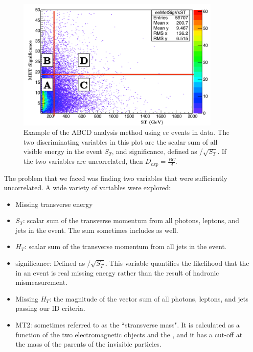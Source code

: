 \begin{figure}[h]
\begin{center}
\includegraphics[width=0.9\textwidth]{Figures/Appendix/ABCD_demo.pdf}
\end{center}
\caption[Example of the ABCD analysis method using $ee$ events in data.]
{Example of the ABCD analysis method using $ee$ events in data. The two discriminating variables in this plot
are the scalar sum of all visible energy in the event $S_T$, and \ETmiss significance, defined as \ETmiss/$\sqrt{S_T}$. If the two 
variables are uncorrelated, then $D_{exp}= \frac{BC}{A}$.}
\label{fig:ABCD}
\end{figure}

The problem that we faced was finding two variables that were sufficiently uncorrelated. 
A wide variety of variables were explored:
\begin{itemize}
\item Missing transverse energy \ETmiss
\item $S_T$: scalar sum of the transverse momentum from all photons, leptons, and jets in the event. The sum sometimes includes \ETmiss as well.
\item $H_T$: scalar sum of the transverse momentum from all jets in the event. 
\item \ETmiss significance: Defined as \ETmiss/$\sqrt{S_T}$. This variable quantifies the likelihood that the \ETmiss in an event is real missing energy rather than the result of hadronic mismeasurement. 
\item Missing $H_T$: the magnitude of the vector sum of all photons, leptons, and jets passing our ID criteria.
\item MT2: sometimes referred to as the ``stransverse mass". It is calculated as a function of the two electromagnetic objects and the \ETmiss, and it has a cut-off at the mass of the parents of the invisible particles.
\end{itemize}

